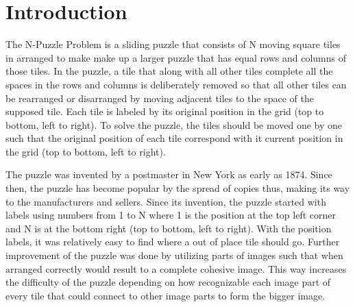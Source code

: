 \section{Introduction}

\par The N-Puzzle Problem is a sliding puzzle that consists of N moving square tiles in arranged to make make up a larger puzzle that has equal rows and columns of those tiles. In the puzzle, a tile that along with all other tiles complete all the spaces in the rows and columns is deliberately removed so that all other tiles can be rearranged or disarranged by moving adjacent tiles to the space of the supposed tile. Each tile is labeled by its original position in the grid (top to bottom, left to right). To solve the puzzle, the tiles should be moved one by one such that the original position of each tile correspond with it current position in the grid (top to bottom, left to right).

\par The puzzle was invented by a postmaster in New York as early as 1874. Since then, the puzzle has become popular by the spread of copies thus, making its way to the manufacturers and sellers. Since its invention, the puzzle started with labels using numbers from 1 to N where 1 is the position at the top left corner and N is at the bottom right (top to bottom, left to right). With the position labels, it was relatively easy to find where a out of place tile should go. Further improvement of the puzzle was done by utilizing parts of images such that when arranged correctly would result to a complete cohesive image. This way increases the difficulty of the puzzle depending on how recognizable each image part of every tile that could connect to other image parts to form the bigger image.
